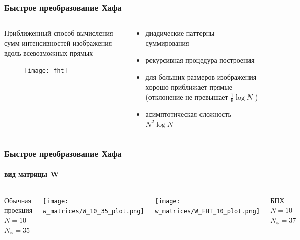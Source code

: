 
\begin{frame}
\frametitle{Быстрое преобразование Хафа}
\begin{columns}[T,onlytextwidth]
  \hspace*{-0.5cm}
  \begin{column}{0.65\textwidth}
  Приближенный способ вычисления сумм интенсивностей изображения вдоль всевозможных прямых
  \begin{figure}
    \texttt{[image: fht]}
  \end{figure}
  \end{column}
  \begin{column}{0.45\textwidth}
  \begin{itemize}
    \item диадические паттерны суммирования
    \item рекурсивная процедура построения
    \item для больших размеров изображения хорошо приближает прямые (отклонение не превышает  $\frac 1 6 \log N$ ) %
    \item асимптотическая сложность $N^2 \log N$
  \end{itemize}
  \end{column}
\end{columns}

\end{frame}


\begin{frame}
\frametitle{Быстрое преобразование Хафа}
\framesubtitle{вид матрицы W}
\centering
\begin{columns}

Обычная проекция \\
$N = 10$ \\
$N_\varphi = 35$

\texttt{[image: w\_matrices/W\_10\_35\_plot.png]}

\texttt{[image: w\_matrices/W\_FHT\_10\_plot.png]}

БПХ \\
$N = 10$ \\
$N_\varphi = 37$ \\
\end{columns}
\end{frame}


